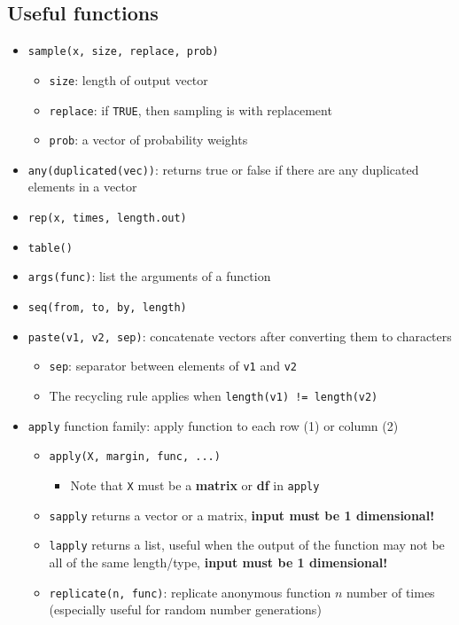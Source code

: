 \documentclass{article}
\begin{document}
\begin{multicols}{2}
\subsection*{Useful functions}
\begin{itemize}
	\item \texttt{sample(x, size, replace, prob)}
	\begin{itemize}
		\item \texttt{size}: length of output vector
		\item \texttt{replace}: if \texttt{TRUE}, then sampling is with replacement
		\item \texttt{prob}: a vector of probability weights
	\end{itemize}
	\item \texttt{any(duplicated(vec))}: returns true or false if there are any duplicated elements in a vector
	\item \texttt{rep(x, times, length.out)}
	\item \texttt{table()}
	\item \texttt{args(func)}: list the arguments of a function
	\item \texttt{seq(from, to, by, length)}
	\item \texttt{paste(v1, v2, sep)}: concatenate vectors after converting them to characters
	\begin{itemize}
		\item \texttt{sep}: separator between elements of \texttt{v1} and \texttt{v2}
		\item The recycling rule applies when \texttt{length(v1) != length(v2)}
	\end{itemize}
	\item \texttt{apply} function family: apply function to each row (1) or column (2)
	\begin{itemize}
		\item \texttt{apply(X, margin, func, ...)}
		\begin{itemize}
			\item Note that \texttt{X} must be a \textbf{matrix} or \textbf{df} in \texttt{apply}
		\end{itemize}
		\item \texttt{sapply} returns a vector or a matrix, \textbf{input must be 1 dimensional!}
		\item \texttt{lapply} returns a list, useful when the output of the function may not be all of the same length/type, \textbf{input must be 1 dimensional!}
		\item \texttt{replicate(n, func)}: replicate anonymous function $n$ number of times (especially useful for random number generations)

\end{itemize}
\end{itemize}
\end{multicols}
\end{document}
